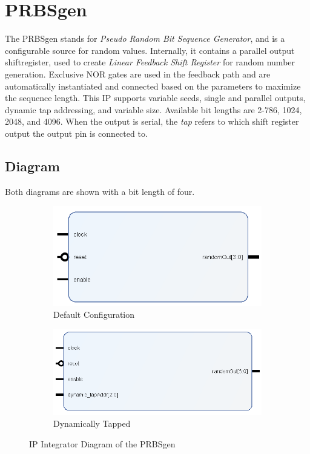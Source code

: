\documentclass[11pt]{article}
\begin{document}
\section{PRBS\textunderscore gen}
The PRBS\textunderscore gen stands for \textit{Pseudo Random Bit Sequence Generator}, and is a configurable source for random values. Internally, it
contains a parallel output shift\textunderscore register, used to create \textit{Linear Feedback Shift Register} for random number generation. Exclusive
NOR gates are used in the feedback path and are automatically instantiated and connected based on the parameters to maximize the sequence length. This IP
supports variable seeds, single and parallel outputs, dynamic tap addressing, and variable size. Available bit lengths are 2-786, 1024, 2048, and 4096.
When the output is serial, the \textit{tap} refers to which shift register output the output pin is connected to.
\subsection{Diagram}
Both diagrams are shown with a bit length of four.
\begin{figure}[H]
	\centering
	\begin{subfigure}[t]{0.45\linewidth}
		\includegraphics[width=\linewidth]{images/PRBS_gen_default}
		\caption{Default Configuration}
	\end{subfigure}
	\begin{subfigure}[t]{0.35\linewidth}
		\includegraphics[width=\linewidth]{images/PRBS_gen_dynamic}
		\caption{Dynamically Tapped}
	\end{subfigure}
	\caption{IP Integrator Diagram of the PRBS\textunderscore gen}
\end{figure}
\end{document}
